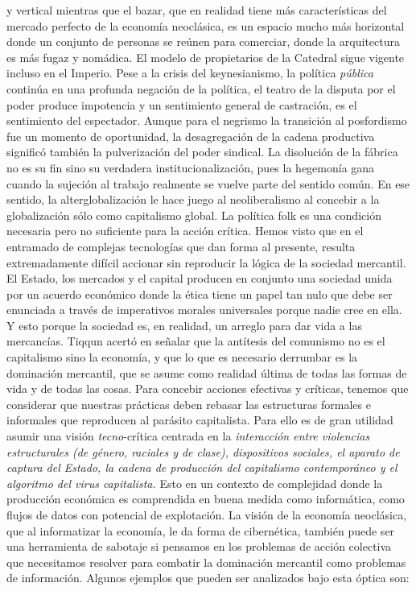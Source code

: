 \documentclass[
]{article}
\begin{document}
y vertical mientras que el bazar, que en realidad tiene más
características del mercado perfecto de la economía neoclásica, es un
espacio mucho más horizontal donde un conjunto de personas se reúnen
para comerciar, donde la arquitectura es más fugaz y nomádica. El modelo
de propietarios de la Catedral sigue vigente incluso en el Imperio. Pese
a la crisis del keynesianismo, la política \emph{pública} continúa en
una profunda negación de la política, el teatro de la disputa por el
poder produce impotencia y un sentimiento general de castración, es el
sentimiento del espectador. Aunque para el negrismo la transición al
posfordismo fue un momento de oportunidad, la desagregación de la cadena
productiva significó también la pulverización del poder sindical. La
disolución de la fábrica no es su fin sino su verdadera
institucionalización, pues la hegemonía gana cuando la sujeción al
trabajo realmente se vuelve parte del sentido común. En ese sentido, la
alterglobalización le hace juego al neoliberalismo al concebir a la
globalización sólo como capitalismo global. La política folk es una
condición necesaria pero no suficiente para la acción crítica. Hemos
visto que en el entramado de complejas tecnologías que dan forma al
presente, resulta extremadamente difícil accionar sin reproducir la
lógica de la sociedad mercantil. El Estado, los mercados y el capital
producen en conjunto una sociedad unida por un acuerdo económico donde
la ética tiene un papel tan nulo que debe ser enunciada a través de
imperativos morales universales porque nadie cree en ella. Y esto porque
la sociedad es, en realidad, un arreglo para dar vida a las mercancías.
Tiqqun acertó en señalar que la antítesis del comunismo no es el
capitalismo sino la economía, y que lo que es necesario derrumbar es la
dominación mercantil, que se asume como realidad última de todas las
formas de vida y de todas las cosas. Para concebir acciones efectivas y
críticas, tenemos que considerar que nuestras prácticas deben rebasar
las estructuras formales e informales que reproducen al parásito
capitalista. Para ello es de gran utilidad asumir una visión
\emph{tecno}-crítica centrada en la \emph{interacción entre violencias
estructurales (de género, raciales y de clase), dispositivos sociales,
el aparato de captura del Estado, la cadena de producción del
capitalismo contemporáneo y el algoritmo del virus capitalista.} Esto en
un contexto de complejidad donde la producción económica es comprendida
en buena medida como informática, como flujos de datos con potencial de
explotación. La visión de la economía neoclásica, que al informatizar la
economía, le da forma de cibernética, también puede ser una herramienta
de sabotaje si pensamos en los problemas de acción colectiva que
necesitamos resolver para combatir la dominación mercantil como
problemas de información. Algunos ejemplos que pueden ser analizados
bajo esta óptica son:
\end{document}
